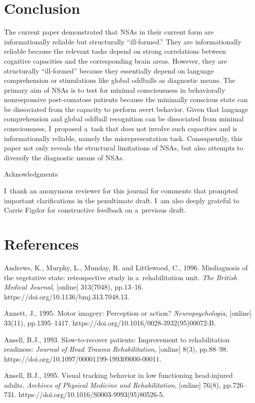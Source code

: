 \section{Conclusion}
The current paper demonstrated that NSAs in their current form are informationally reliable but structurally ``ill-formed.'' They are informationally reliable because the relevant tasks depend on strong correlations between cognitive capacities and the corresponding brain areas. However, they are structurally ``ill-formed'' because they essentially depend on language comprehension or stimulations like global oddballs as diagnostic means. The primary aim of NSAs is to test for minimal consciousness in behaviorally nonresponsive post-comatose patients because the minimally conscious state can be dissociated from the capacity to perform overt behavior. Given that language comprehension and global oddball recognition can be dissociated from minimal consciousness, I~proposed a~task that does not involve such capacities and is informationally reliable, namely the misrepresentation task. Consequently, this paper not only reveals the structural limitations of NSAs, but also attempts to diversify the diagnostic means of NSAs.

Acknowledgments

I~thank an anonymous reviewer for this journal for comments that prompted important clarifications in the penultimate draft. I~am also deeply grateful to Carrie Figdor for constructive feedback on a~previous draft.

\section*{References}
Andrews, K., Murphy, L., Munday, R. and Littlewood, C., 1996. Misdiagnosis of the vegetative state: retrospective study in a~rehabilitation unit. \textit{The British Medical Journal}, [online] 313(7048), pp.13–16. https://doi.org/10.1136/bmj.313.7048.13.

Annett, J., 1995. Motor imagery: Perception or action? \textit{Neuropsychologia}, [online] 33(11), pp.1395–1417. https://doi.org/10.1016/0028-3932(95)00072-B.

Ansell, B.J., 1993. Slow-to-recover patients: Improvement to rehabilitation readiness: \textit{Journal of Head Trauma Rehabilitation}, [online] 8(3), pp.88–98. https://doi.org/10.1097/00001199-199309000-00011.

Ansell, B.J., 1995. Visual tracking behavior in low functioning head-injured adults. \textit{Archives of Physical Medicine and Rehabilitation}, [online] 76(8), pp.726–731. https://doi.org/10.1016/S0003-9993(95)80526-5.

